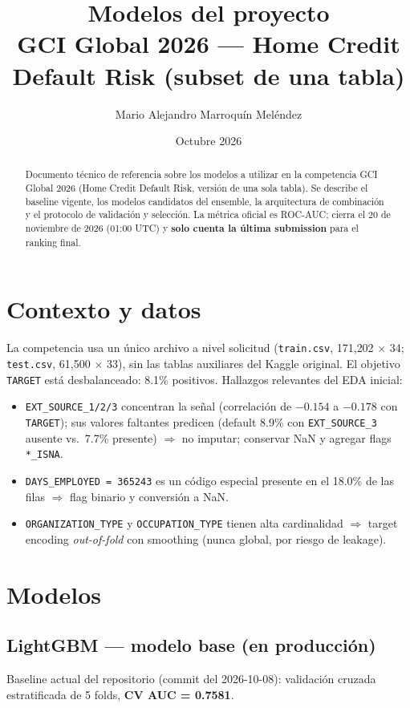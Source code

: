 \documentclass[11pt,a4paper]{article}
\title{\textbf{Modelos del proyecto}\\[4pt]
\large GCI Global 2026 --- Home Credit Default Risk (subset de una tabla)}
\author{Mario Alejandro Marroqu\'in Mel\'endez}
\date{Octubre 2026}
\begin{document}
\maketitle

\begin{abstract}
\noindent Documento t\'ecnico de referencia sobre los modelos a utilizar en la
competencia GCI Global 2026 (Home Credit Default Risk, versi\'on de una sola
tabla). Se describe el baseline vigente, los modelos candidatos del ensemble,
la arquitectura de combinaci\'on y el protocolo de validaci\'on y selecci\'on.
La m\'etrica oficial es ROC-AUC; cierra el 20 de noviembre de 2026 (01:00 UTC)
y \textbf{solo cuenta la \'ultima submission} para el ranking final.
\end{abstract}

\tableofcontents

\section{Contexto y datos}
La competencia usa un \'unico archivo a nivel solicitud (\texttt{train.csv},
171{,}202 $\times$ 34; \texttt{test.csv}, 61{,}500 $\times$ 33), sin las tablas
auxiliares del Kaggle original. El objetivo \texttt{TARGET} est\'a desbalanceado:
8.1\% positivos. Hallazgos relevantes del EDA inicial:
\begin{itemize}
  \item \texttt{EXT\_SOURCE\_1/2/3} concentran la se\~nal (correlaci\'on de
        $-0.154$ a $-0.178$ con \texttt{TARGET}); sus valores faltantes predicen
        (default 8.9\% con \texttt{EXT\_SOURCE\_3} ausente vs.\ 7.7\% presente)
        $\Rightarrow$ no imputar; conservar NaN y agregar flags \texttt{*\_ISNA}.
  \item \texttt{DAYS\_EMPLOYED = 365243} es un c\'odigo especial presente en el
        18.0\% de las filas $\Rightarrow$ flag binario y conversi\'on a NaN.
  \item \texttt{ORGANIZATION\_TYPE} y \texttt{OCCUPATION\_TYPE} tienen alta
        cardinalidad $\Rightarrow$ target encoding \emph{out-of-fold} con
        smoothing (nunca global, por riesgo de leakage).
\end{itemize}

\section{Modelos}

\subsection{LightGBM --- modelo base (en producci\'on)}
Baseline actual del repositorio (commit del 2026-10-08): validaci\'on cruzada
estratificada de 5 folds, \textbf{CV AUC = 0.7581}.
\end{document}
